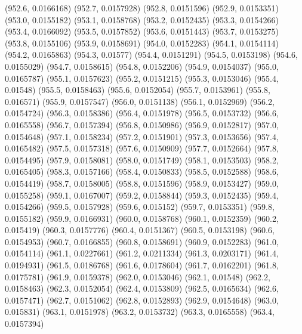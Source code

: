 {					(952.6, 0.0166168)
					(952.7, 0.0157928)
					(952.8, 0.0151596)
					(952.9, 0.0153351)
					(953.0, 0.0155182)
					(953.1, 0.0158768)
					(953.2, 0.0152435)
					(953.3, 0.0154266)
					(953.4, 0.0166092)
					(953.5, 0.0157852)
					(953.6, 0.0151443)
					(953.7, 0.0153275)
					(953.8, 0.0155106)
					(953.9, 0.0158691)
					(954.0, 0.0152283)
					(954.1, 0.0154114)
					(954.2, 0.0165863)
					(954.3, 0.01577)
					(954.4, 0.0151291)
					(954.5, 0.0153198)
					(954.6, 0.0155029)
					(954.7, 0.0158615)
					(954.8, 0.0152206)
					(954.9, 0.0154037)
					(955.0, 0.0165787)
					(955.1, 0.0157623)
					(955.2, 0.0151215)
					(955.3, 0.0153046)
					(955.4, 0.01548)
					(955.5, 0.0158463)
					(955.6, 0.0152054)
					(955.7, 0.0153961)
					(955.8, 0.016571)
					(955.9, 0.0157547)
					(956.0, 0.0151138)
					(956.1, 0.0152969)
					(956.2, 0.0154724)
					(956.3, 0.0158386)
					(956.4, 0.0151978)
					(956.5, 0.0153732)
					(956.6, 0.0165558)
					(956.7, 0.0157394)
					(956.8, 0.0150986)
					(956.9, 0.0152817)
					(957.0, 0.0154648)
					(957.1, 0.0158234)
					(957.2, 0.0151901)
					(957.3, 0.0153656)
					(957.4, 0.0165482)
					(957.5, 0.0157318)
					(957.6, 0.0150909)
					(957.7, 0.0152664)
					(957.8, 0.0154495)
					(957.9, 0.0158081)
					(958.0, 0.0151749)
					(958.1, 0.0153503)
					(958.2, 0.0165405)
					(958.3, 0.0157166)
					(958.4, 0.0150833)
					(958.5, 0.0152588)
					(958.6, 0.0154419)
					(958.7, 0.0158005)
					(958.8, 0.0151596)
					(958.9, 0.0153427)
					(959.0, 0.0155258)
					(959.1, 0.0167007)
					(959.2, 0.0158844)
					(959.3, 0.0152435)
					(959.4, 0.0154266)
					(959.5, 0.0157928)
					(959.6, 0.015152)
					(959.7, 0.0153351)
					(959.8, 0.0155182)
					(959.9, 0.0166931)
					(960.0, 0.0158768)
					(960.1, 0.0152359)
					(960.2, 0.015419)
					(960.3, 0.0157776)
					(960.4, 0.0151367)
					(960.5, 0.0153198)
					(960.6, 0.0154953)
					(960.7, 0.0166855)
					(960.8, 0.0158691)
					(960.9, 0.0152283)
					(961.0, 0.0154114)
					(961.1, 0.0227661)
					(961.2, 0.0211334)
					(961.3, 0.0203171)
					(961.4, 0.0194931)
					(961.5, 0.0186768)
					(961.6, 0.0178604)
					(961.7, 0.0162201)
					(961.8, 0.0175781)
					(961.9, 0.0159378)
					(962.0, 0.0153046)
					(962.1, 0.01548)
					(962.2, 0.0158463)
					(962.3, 0.0152054)
					(962.4, 0.0153809)
					(962.5, 0.0165634)
					(962.6, 0.0157471)
					(962.7, 0.0151062)
					(962.8, 0.0152893)
					(962.9, 0.0154648)
					(963.0, 0.015831)
					(963.1, 0.0151978)
					(963.2, 0.0153732)
					(963.3, 0.0165558)
					(963.4, 0.0157394)
}
